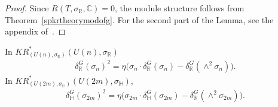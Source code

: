 \begin{proof}
Since $R(T,
\sigma_\mathbb{R}, \mathbb{C})=0$, the module structure follows from Theorem~\ref{spkrtheorymodofg}.
For the second part of the Lemma, see the appendix of~\cite{Se}.
\end{proof}
\begin{Proposition}
\label{equivkrthysquaresigma}
In $KR^*_{(U(n),
\sigma_\mathbb{R})}(U(n),
\sigma_\mathbb{R})$
\begin{gather}
\label{realsigmasquare}
\delta_\mathbb{R}^G(\sigma_n)^2
=\eta\big(\sigma_n\cdot\delta_\mathbb{R}^G(\sigma_n)-\delta_\mathbb{R}^G(\wedge^2\sigma_n)\big).
\end{gather}
In $KR^*_{(U(2m),
\sigma_\mathbb{H})}(U(2m),
\sigma_\mathbb{H})$,
\begin{gather}
\label{quatsigmasquare}
\delta_\mathbb{H}^G(\sigma_{2m})^2=\eta\big(\sigma_{2m}
\cdot\delta_\mathbb{H}^G(\sigma_{2m})-\delta_\mathbb{R}^G(\wedge^2\sigma_{2m})\big).
\end{gather}
\end{Proposition}
